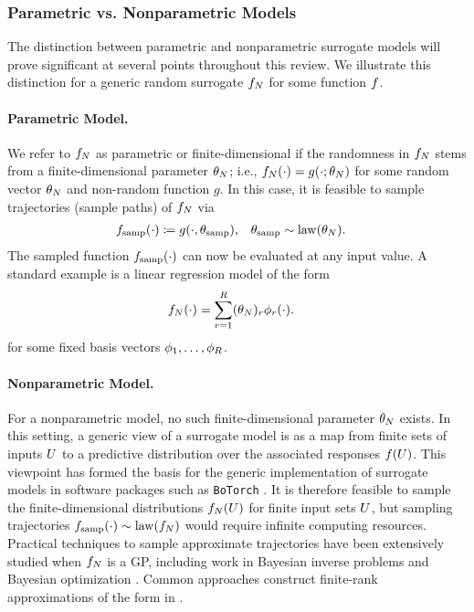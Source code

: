 \documentclass[12pt]{article}
\begin{document}
\subsubsection{Parametric vs. Nonparametric Models}
The distinction between parametric and nonparametric surrogate models will 
prove significant at several points throughout this review. We illustrate this
distinction for a generic random surrogate $\funcEm[\Ndesign]$ for some 
function $\func$. 

\paragraph{Parametric Model.}
We refer to $\funcEm[\Ndesign]$ as parametric 
or finite-dimensional if the randomness in $\funcEm[\Ndesign]$ stems from 
a finite-dimensional parameter $\theta_{\Ndesign}$; i.e., 
$\funcEm[\Ndesign](\cdot) = g(\cdot; \theta_{\Ndesign})$ for some 
random vector $\theta_{\Ndesign}$ and non-random function $g$.
In this case, it is feasible to sample trajectories (sample paths) of 
$\funcEm[\Ndesign]$ via 
\begin{align}
&\func_{\mathrm{samp}}(\cdot) \Def g(\cdot, \theta_{\mathrm{samp}}),
&&\theta_{\mathrm{samp}} \sim \mathrm{law}(\theta_{\Ndesign}).
\end{align}
The sampled function $\func_{\mathrm{samp}}(\cdot)$ can now 
be evaluated at any input value. A standard example is a linear 
regression model of the form
\begin{align}
\funcEm[\Ndesign](\cdot) &= \sum_{\idxBasis=1}^{\dimBasis} (\theta_{\Ndesign})_{\idxBasis} \basisVec_{\idxBasis}(\cdot).
\label{eq:finite-basis}
\end{align}
for some fixed basis vectors $\basisVec_{1}, \dots, \basisVec_{\dimBasis}$.
 
\paragraph{Nonparametric Model.} For a nonparametric model, no such finite-dimensional 
parameter $\theta_{\Ndesign}$ exists. In this setting, a generic view of a 
surrogate model is as a map from finite sets of inputs $\parMat$ to a predictive distribution 
over the associated responses $\func(\parMat)$. This viewpoint has formed the basis 
for the generic implementation of surrogate models in software packages such as 
\verb+BoTorch+ \citep{botorch}. It is therefore feasible to sample the finite-dimensional distributions
$\funcEm[\Ndesign](\parMat)$ for finite input sets $\parMat$, but sampling trajectories
$\func_{\mathrm{samp}}(\cdot) \sim \mathrm{law}(\funcEm[\Ndesign])$ would require 
infinite computing resources. Practical techniques to sample approximate trajectories have been
extensively studied when $\funcEm[\Ndesign]$ is a GP, including work in 
Bayesian inverse problems \citep{dimRedPolyChaos,functionSpaceMCMC} 
and Bayesian optimization \citep{pathwiseConditioning,samplingGPPosts}.
Common approaches construct finite-rank approximations of the form  
in .
\end{document}
